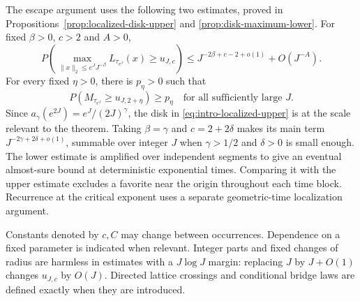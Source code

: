 The escape argument uses the following two estimates, proved in
Propositions~\ref{prop:localized-disk-upper} and
\ref{prop:disk-maximum-lower}. For fixed $\beta>0$, $c>2$ and $A>0$,
\begin{equation}\label{eq:intro-localized-upper}
 P\left(\max_{\|x\|_2\le e^JJ^{-\beta}}
 L_{\tau_{e^J}}(x)\ge u_{J,c}\right)
 \le J^{-2\beta+c-2+o(1)}+O(J^{-A}).
\end{equation}
For every fixed $\eta>0$, there is $p_\eta>0$ such that
\begin{equation}\label{eq:intro-disk-lower}
 P(M_{\tau_{e^J}}\ge u_{J,2+\eta})\ge p_\eta
 \quad\text{for all sufficiently large }J.
\end{equation}
Since $a_\gamma(e^{2J})=e^J/(2J)^\gamma$, the disk in
\eqref{eq:intro-localized-upper} is at the scale relevant to the theorem.
Taking $\beta=\gamma$ and $c=2+2\delta$ makes its main term
$J^{-2\gamma+2\delta+o(1)}$, summable over integer $J$ when
$\gamma>1/2$ and $\delta>0$ is small enough. The lower estimate is
amplified over independent segments to give an eventual almost-sure
bound at deterministic exponential times. Comparing it with the upper
estimate excludes a favorite near the origin throughout each time block.
Recurrence at the critical exponent uses a separate geometric-time
localization argument.

Constants denoted by $c,C$ may change between occurrences. Dependence on a
fixed parameter is indicated when relevant. Integer parts and fixed changes
of radius are harmless in estimates with a $J\log J$ margin: replacing $J$
by $J+O(1)$ changes $u_{J,c}$ by $O(J)$. Directed lattice crossings and
conditional bridge laws are defined exactly when they are introduced.
